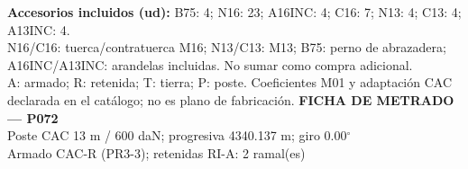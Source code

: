 \begingroup\scriptsize
\textbf{Accesorios incluidos (ud):} B75: 4; N16: 23; A16INC: 4; C16: 7; N13: 4; C13: 4; A13INC: 4.\\
N16/C16: tuerca/contratuerca M16; N13/C13: M13; B75: perno de abrazadera; A16INC/A13INC: arandelas incluidas. No sumar como compra adicional.\\
A: armado; R: retenida; T: tierra; P: poste. Coeficientes M01 y adaptación CAC declarada en el catálogo; no es plano de fabricación.
\endgroup\endgroup
\clearpage{}
\begingroup\small\setlength{\parskip}{3pt}\renewcommand{\arraystretch}{1.05}
\textbf{\large FICHA DE METRADO — P072}\\[4pt]
Poste CAC 13 m / 600 daN; progresiva 4340.137 m; giro 0.00\ensuremath{^\circ}\\
Armado CAC-R (PR3-3); retenidas RI-A: 2 ramal(es)\\
\begingroup\scriptsize

